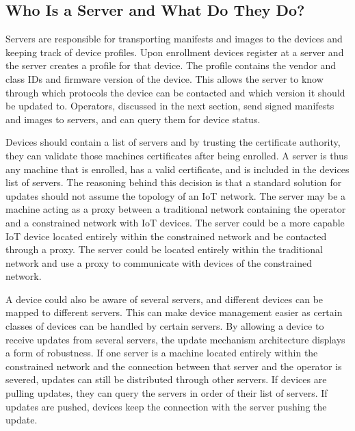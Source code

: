 \documentclass[0-thesis.tex]{subfiles}
\begin{document}
\subsection{Who Is a Server and What Do They Do?}
\label{ssec:who-is-a-server}
Servers are responsible for transporting manifests and images to the devices and keeping
track of device profiles. Upon enrollment devices register at a server and the server
creates a profile for that device. The profile contains the vendor and class IDs and
firmware version of the device. This allows the server to know through which protocols the
device can be contacted and which version it should be updated to. Operators, discussed in
the next section, send signed manifests and images to servers, and can query them for
device status.

Devices should contain a list of servers and by trusting the certificate authority, they
can validate those machines certificates after being enrolled. A server is thus any
machine that is enrolled, has a valid certificate, and is included in the devices list of
servers. The reasoning behind this decision is that a standard solution for updates should
not assume the topology of an IoT network. The server may be a machine acting as a proxy
between a traditional network containing the operator and a constrained network with IoT
devices. The server could be a more capable IoT device located entirely within the
constrained network and be contacted through a proxy. The server could be located entirely
within the traditional network and use a proxy to communicate with devices of the
constrained network.

A device could also be aware of several servers, and different devices can be mapped to
different servers. This can make device management easier as certain classes of devices
can be handled by certain servers. By allowing a device to receive updates from several
servers, the update mechanism architecture displays a form of robustness. If one server is
a machine located entirely within the constrained network and the connection between that
server and the operator is severed, updates can still be distributed through other
servers. If devices are pulling updates, they can query the servers in order of their list
of servers. If updates are pushed, devices keep the connection with the server pushing the
update.
\end{document}
